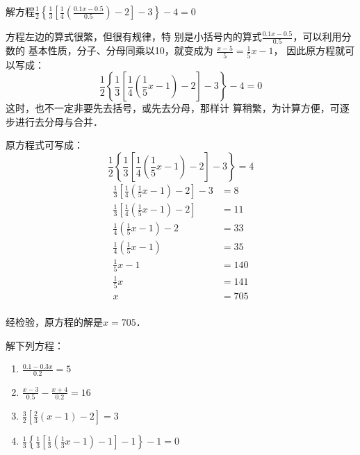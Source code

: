\begin{example}
    解方程$\frac{1}{2}\left\{\frac{1}{3}\left[\frac{1}{4}\left(\frac{0.1x-0.5}{0.5}\right)-2\right]-3\right\}-4=0$
\end{example}

\begin{analyze}
方程左边的算式很繁，但很有规律，特
    别是小括号内的算式$\frac{0.1x-0.5}{0.5}$，可以利用分数的
    基本性质，分子、分母同乘以10，就变成为
$\frac{x-5}{5}=\frac{1}{5}x-1$，
    因此原方程就可以写成：
   \[\frac{1}{2}\left\{\frac{1}{3}\left[\frac{1}{4}\left(\frac{1}{5}x-1\right)-2\right]-3\right\}-4=0 \]
    这时，也不一定非要先去括号，或先去分母，那样计
    算稍繁，为计算方便，可逐步进行去分母与合并．
\end{analyze}

\begin{solution}
    原方程式可写成：\[\frac{1}{2}\left\{\frac{1}{3}\left[\frac{1}{4}\left(\frac{1}{5}x-1\right)-2\right]-3\right\}=4 \]
\begin{align*}
    \frac{1}{3}\left[\frac{1}{4}\left(\frac{1}{5}x-1\right)-2\right]-3 &=8  \tag{两边乘以2}\\
    \frac{1}{3}\left[\frac{1}{4}\left(\frac{1}{5}x-1\right)-2\right]&=11   \tag{移项、合并}\\
    \frac{1}{4}\left(\frac{1}{5}x-1\right)-2&=33  \tag{两边乘以3}\\
    \frac{1}{4}\left(\frac{1}{5}x-1\right)&=35   \tag{移项、合并}\\
    \frac{1}{5}x-1&=140 \tag{两边乘以4}\\
    \frac{1}{5}x&=141  \tag{移项、合并}\\
    x&=705  \tag{两边乘以5}\\
\end{align*}   

经检验，原方程的解是$x=705$．
\end{solution}

\begin{ex}
解下列方程：
\begin{enumerate}
    \item $\frac{0.1-0.3x}{0.2}=5$
    \item $\frac{x-3}{0.5}-\frac{x+4}{0.2}=16$
    \item $\frac{3}{2}\left[\frac{2}{3}(x-1)-2\right]=3$
    \item $\frac{1}{3}\left\{\frac{1}{3}\left[\frac{1}{3}\left(\frac{1}{3}x-1\right)-1\right]-1\right\}-1=0$
\end{enumerate}
\end{ex}

